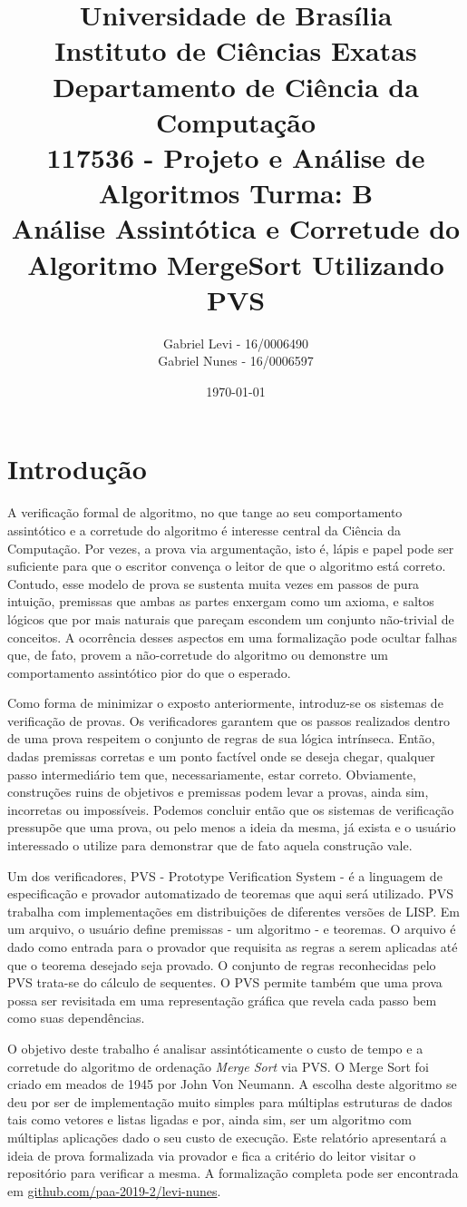 \documentclass[12pt]{article}
\title{{\large Universidade de Brasília \\ Instituto de Ciências Exatas \\
Departamento de Ciência da Computação} \\[1cm]
117536 - Projeto e Análise de Algoritmos Turma: B\\[.5cm]
Análise Assintótica e Corretude do Algoritmo MergeSort Utilizando PVS}
\author{Gabriel Levi - 16/0006490 \\
        Gabriel Nunes - 16/0006597}
\date{\today}
\theoremstyle{definition}
\begin{document}
\maketitle
\newpage

\section{Introdução}
\noindent A verificação formal de algoritmo, no que tange ao seu comportamento assintótico e a corretude do algoritmo é interesse
central da Ciência da Computação. Por vezes, a prova via argumentação, isto é, lápis e papel pode ser suficiente para que o escritor
convença o leitor de que o algoritmo está correto. Contudo, esse modelo de prova se sustenta muita vezes em passos de pura intuição,
premissas que ambas as partes enxergam como um axioma, e saltos lógicos que por mais naturais que pareçam escondem um conjunto não-trivial
de conceitos. A ocorrência desses aspectos em uma formalização pode ocultar falhas que, de fato, provem a não-corretude do algoritmo ou demonstre
um comportamento assintótico pior do que o esperado.

Como forma de minimizar o exposto anteriormente, introduz-se os sistemas de verificação de provas. Os verificadores garantem que os passos realizados
dentro de uma prova respeitem o conjunto de regras de sua lógica intrínseca. Então, dadas premissas corretas e um ponto factível onde se deseja chegar, qualquer
passo intermediário tem que, necessariamente, estar correto. Obviamente, construções ruins de objetivos e premissas podem levar a provas, ainda sim, incorretas
ou impossíveis. Podemos concluir então que os sistemas de verificação pressupõe que uma prova, ou pelo menos a ideia da mesma, já exista e o usuário interessado
o utilize para demonstrar que de fato aquela construção vale.

Um dos verificadores, PVS - Prototype Verification System - é a linguagem de especificação e provador automatizado de teoremas que aqui será utilizado.
PVS trabalha com implementações em distribuições de diferentes versões de LISP. Em um arquivo, o usuário define premissas - um algoritmo - e teoremas.
O arquivo é dado como entrada para o provador que requisita as regras a serem aplicadas até que o teorema desejado seja provado. O conjunto de regras reconhecidas pelo
PVS trata-se do cálculo de sequentes. O PVS permite também que uma prova possa ser revisitada em uma representação gráfica que
revela cada passo bem como suas dependências.

O objetivo deste trabalho é analisar assintóticamente o custo de tempo e a corretude do algoritmo de ordenação \textit{Merge Sort} via PVS. O Merge Sort foi criado
em meados de 1945 por John Von Neumann. A escolha deste algoritmo se deu por ser de implementação muito simples para múltiplas estruturas de dados tais como
vetores e listas ligadas e por, ainda sim, ser um algoritmo com múltiplas aplicações dado o seu custo de execução. Este relatório apresentará a ideia de prova
formalizada via provador e fica a critério do leitor visitar o repositório para verificar a mesma. A formalização completa pode ser encontrada em \url{github.com/paa-2019-2/levi-nunes}.
\end{document}
